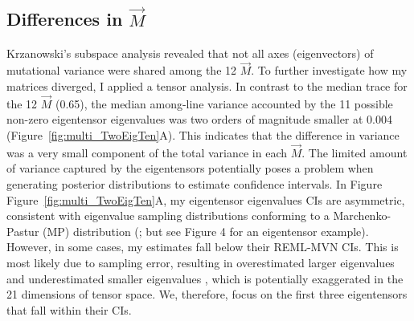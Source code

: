 \subsection{Differences in $\vec{M}$}
Krzanowski’s subspace analysis revealed that not all axes (eigenvectors) of mutational variance were shared among the 12 $\vec{M}$. To further investigate how my matrices diverged, I applied a tensor analysis. In contrast to the median trace for the 12 $\vec{M}$ (0.65), the median among-line variance accounted by the 11 possible non-zero eigentensor eigenvalues was two orders of magnitude smaller at 0.004 (Figure~\ref{fig:multi_TwoEigTen}A). This indicates that the difference in variance was a very small component of the total variance in each $\vec{M}$. The limited amount of variance captured by the eigentensors potentially poses a problem when generating posterior distributions to estimate confidence intervals. In Figure Figure~\ref{fig:multi_TwoEigTen}A, my eigentensor
eigenvalues CIs are asymmetric, consistent with eigenvalue sampling distributions conforming to a Marchenko-Pastur (MP) distribution (\citealt{Blow15}; but see \citealt{Agui14} Figure 4 for an eigentensor example). However, in some cases, my estimates fall below their REML-MVN CIs. This is most likely due to sampling error, resulting in overestimated larger eigenvalues and underestimated smaller eigenvalues \citep{Hill78, Szte17a}, which is potentially exaggerated in the 21 dimensions of tensor space. We, therefore, focus on the first three eigentensors that fall within their CIs.\par

